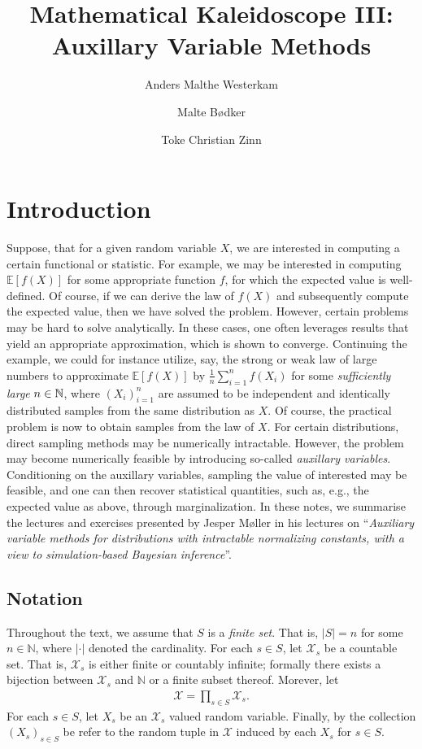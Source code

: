 \documentclass{article}
\title{\LARGE Mathematical Kaleidoscope III: \\ \large Auxillary Variable Methods}
\author[1]{Anders Malthe Westerkam}
\author[2]{Malte Bødker}
\author[3]{Toke Christian Zinn}
\affil[1]{amw@es.aau.dk}
\affil[2]{maltebn@math.aau.dk}
\affil[3]{tokecz@math.aau.dk}
\begin{document}
\maketitle
\section*{Introduction}
Suppose, that for a given random variable $X$, we are interested in computing a certain functional or statistic. For example, we may be interested in computing $\mathbb{E}[f(X)]$ for some appropriate function $f$, for which the expected value is well-defined. Of course, if we can derive the law of $f(X)$ and subsequently compute the expected value, then we have solved the problem. \newline\newline 
However, certain problems may be hard to solve analytically. In these cases, one often leverages results that yield an appropriate approximation, which is shown to converge. Continuing the example, we could for instance utilize, say, the strong or weak law of large numbers to approximate  $\mathbb{E}[f(X)]$ by $\frac{1}{n} \sum_{i = 1}^n f(X_i)$ for some \textit{sufficiently large} $n\in\mathbb{N}$, where $(X_i)_{i = 1}^n$ are assumed to be independent and identically distributed samples from the same distribution as $X$. Of course, the practical problem is now to obtain samples from the law of $X$. \newline\newline
For certain distributions, direct sampling methods may be numerically intractable. However, the problem may become numerically feasible by introducing so-called \textit{auxillary variables}. Conditioning on the auxillary variables, sampling the value of interested may be feasible, and one can then recover statistical quantities, such as, e.g., the expected value as above, through marginalization. \newline\newline
In these notes, we summarise the lectures and exercises presented by Jesper Møller in his lectures on ``\textit{Auxiliary variable methods for distributions with intractable normalizing constants, with a view to simulation-based Bayesian inference}''.
\subsection*{Notation}
Throughout the text, we assume that $S$ is a \textit{finite set}. That is, $|S| = n$ for some $n \in \mathbb{N}$, where $|\cdot|$ denoted the cardinality.\newline\newline
For each $s \in S$, let $\mathcal{X}_s$ be a countable set. That is, $\mathcal{X}_s$ is either finite or countably infinite; formally there exists a bijection between $\mathcal{X}_s$ and $\mathbb{N}$ or a finite subset thereof. Morever, let 
\begin{align}\label{eq:product-set}
    \mathcal{X} = \prod_{s \in S} \mathcal{X}_s.
\end{align} 
For each $s \in S$, let $X_s$ be an $\mathcal{X}_{s}$ valued random variable. Finally, by the collection $(X_s)_{s \in S}$ be refer to the random tuple in $\mathcal{X}$ induced by each $X_s$ for $s \in S$.
\end{document}
